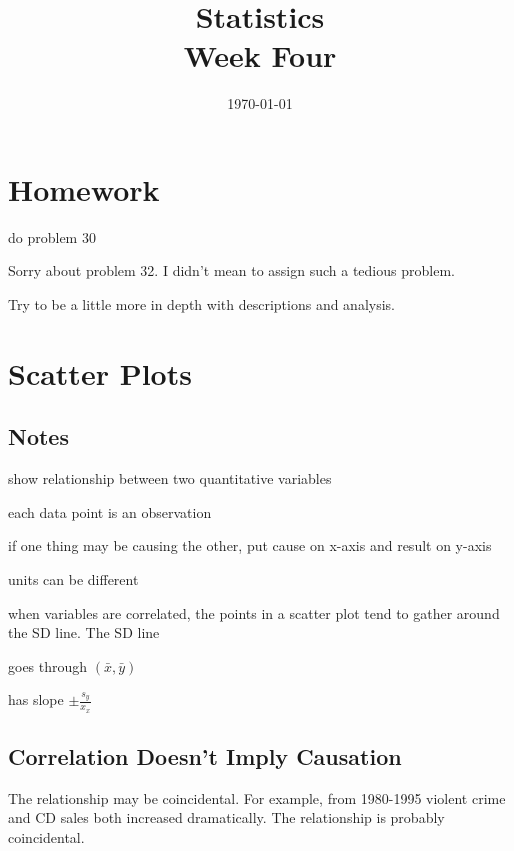 \documentclass{exam}
\title{Statistics \\ Week Four}
\date{\today}
\author{}
\begin{document}
\maketitle
\tableofcontents

  \section{Homework}

  \begin{itemize*}
    \item do problem 30
    \item Sorry about problem 32. I didn't mean to assign such a tedious problem.  
    \item Try to be a little more in depth with descriptions and analysis.
  \end{itemize*}

  \section{Scatter Plots}

  \subsection{Notes}
  \begin{itemize*}
    \item show relationship between two quantitative variables
    \item each data point is an observation
    \item if one thing may be causing the other, put cause on x-axis and result on y-axis
    \item units can be different
    \item when variables are correlated, the points in a scatter plot tend to gather
      around the SD line.  The SD line 
      \begin{itemize*}
        \item goes through $(\bar{x}, \bar{y})$
        \item has slope $\pm \frac{s_y}{x_x}$
      \end{itemize*}
  \end{itemize*}

  \subsection{Correlation Doesn't Imply Causation}  

  The relationship may be coincidental.  For example, from 1980-1995 violent crime
  and CD sales both increased dramatically.  The relationship is probably
  coincidental.  
\end{document}
